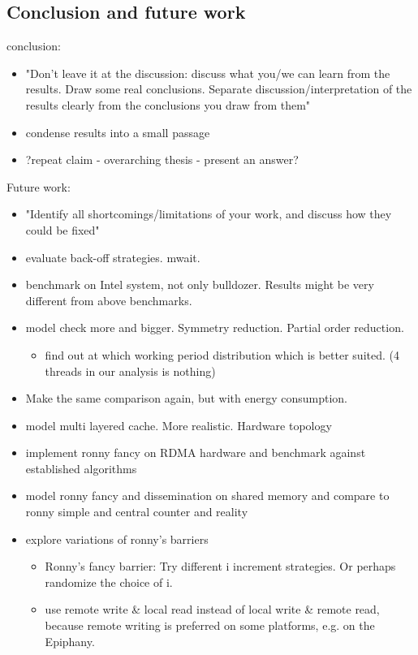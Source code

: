 \documentclass[a4paper, 10pt]{article}
\begin{document}
\begin{enumerate}
\section{Conclusion and future work}
\label{sec:conclusion}
conclusion:
\begin{itemize}
	\item "Don't leave it at the discussion: discuss what you/we can learn from the results. Draw some real conclusions. Separate discussion/interpretation of the results clearly from the conclusions you draw from them"
	\item condense results into a small passage
	\item ?repeat claim - overarching thesis - present an answer?
\end{itemize}

Future work:
\begin{itemize}
	\item "Identify all shortcomings/limitations of your work, and discuss how they could be fixed"
	\item evaluate back-off strategies. mwait.
	\item benchmark on Intel system, not only bulldozer. Results might be very different from above benchmarks.
	\item model check more and bigger. Symmetry reduction. Partial order reduction.
		\begin{itemize}
			\item find out at which working period distribution which is better suited. (4 threads in our analysis is nothing)
		\end{itemize}
	\item Make the same comparison again, but with energy consumption.
	\item model multi layered cache. More realistic. Hardware topology
	\item implement ronny fancy on RDMA hardware and benchmark against established algorithms
	\item model ronny fancy and dissemination on shared memory and compare to ronny simple and central counter and reality
	\item explore variations of ronny's barriers
		\begin{itemize}
			\item Ronny's fancy barrier: Try different i increment strategies. Or perhaps randomize the choice of i.
			\item use remote write \& local read instead of local write \& remote read, because remote writing is preferred on some platforms, e.g. on the Epiphany\cite{epiphany}.
		\end{itemize}
\end{itemize}



\end{enumerate}
\end{document}
